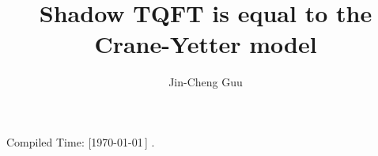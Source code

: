\title{Shadow TQFT is equal to the Crane-Yetter model}
\author{Jin-Cheng Guu}
\date{}



\maketitle
\begin{flushright}
  Compiled Time: [\today\,\DTMcurrenttime] \qquad.
\end{flushright}


\tableofcontents

